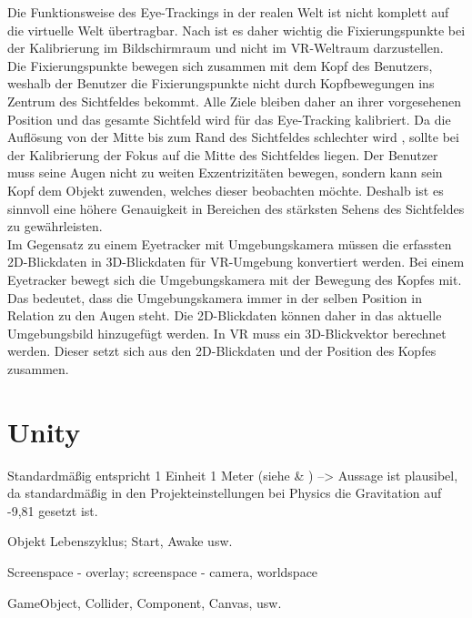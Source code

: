 Die Funktionsweise des Eye-Trackings in der realen Welt ist nicht komplett auf die virtuelle Welt übertragbar. Nach \citeauthor{Clay_Koenig_Koenig_2019} ist es daher wichtig die Fixierungspunkte bei der Kalibrierung im Bildschirmraum und nicht im \ac{VR}-Weltraum darzustellen. Die Fixierungspunkte bewegen sich zusammen mit dem Kopf des Benutzers, weshalb der Benutzer die Fixierungspunkte nicht durch Kopfbewegungen ins Zentrum des Sichtfeldes bekommt. Alle Ziele bleiben daher an ihrer vorgesehenen Position und das gesamte Sichtfeld wird für das Eye-Tracking kalibriert. Da die Auflösung von der Mitte bis zum Rand des Sichtfeldes schlechter wird \cite{Kreylos.2017}, sollte bei der Kalibrierung der Fokus auf die Mitte des Sichtfeldes liegen. Der Benutzer muss seine Augen nicht zu weiten Exzentrizitäten bewegen, sondern kann sein Kopf dem Objekt zuwenden, welches dieser beobachten möchte. Deshalb ist es sinnvoll eine höhere Genauigkeit in Bereichen des stärksten Sehens des Sichtfeldes zu gewährleisten. \cite{Clay_Koenig_Koenig_2019} \\ 
Im Gegensatz zu einem Eyetracker mit Umgebungskamera müssen die erfassten 2D-Blickdaten in 3D-Blickdaten für \ac{VR}-Umgebung konvertiert werden. Bei einem Eyetracker bewegt sich die Umgebungskamera mit der Bewegung des Kopfes mit. Das bedeutet, dass die Umgebungskamera immer in der selben Position in Relation zu den Augen steht. Die 2D-Blickdaten können daher in das aktuelle Umgebungsbild hinzugefügt werden. In \ac{VR} muss ein 3D-Blickvektor berechnet werden. Dieser setzt sich aus den 2D-Blickdaten und der Position des Kopfes zusammen. \cite{Clay_Koenig_Koenig_2019}

\section{Unity}
Standardmäßig entspricht 1 Einheit 1 Meter (siehe \cite{BrentAllard.2017} \& \cite{AVividLight.2010}) --> Aussage ist plausibel, da standardmäßig in den Projekteinstellungen bei Physics die Gravitation auf -9,81 gesetzt ist.

Objekt Lebenszyklus; Start, Awake usw.

Screenspace - overlay; screenspace - camera, worldspace

GameObject, Collider, Component, Canvas, usw.

